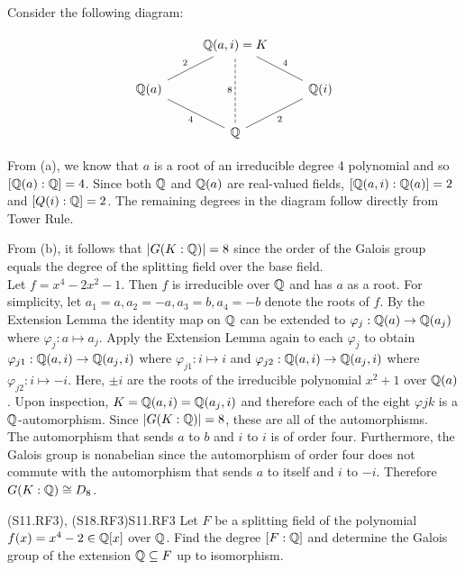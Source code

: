 \documentclass[../AlgebraQualSolutions.tex]{subfiles}
\begin{document}
\begin{solution}
	Consider the following diagram:

	\[
		\begin{tikzcd}
			& \Q(a,i) = K & \\
			\Q(a) \ar[ur,no head, "2"] & & \Q(i) \ar[ul,no head, "4"']\\
			& \Q \ar[ul, no head, "4"] \ar[ur, no head, "2"'] \ar[uu, dashed, no head, "8"] &
		\end{tikzcd}
		\]

	From (a), we know that $a$ is a root of an irreducible degree 4 polynomial and so $[\mathbb{Q}(a): \mathbb{Q}] = 4$. Since both $\mathbb{Q}$ and $\mathbb{Q}(a)$ are real-valued fields, $[\mathbb{Q}(a,i): \mathbb{Q}(a)] = 2$ and $[Q(i): \mathbb{Q}] = 2$. The remaining degrees in the diagram follow directly from Tower Rule. \\
\end{solution}
\begin{solution}
	From (b), it follows that $|G(K:\mathbb{Q})| = 8$ since the order of the Galois group equals the degree of the splitting field over the base field.\\
	
	Let $f = x^4 - 2x^2 - 1$. Then $f$ is irreducible over $\mathbb{Q}$ and has $a$ as a root. For simplicity, let $a_1 = a,a_2 = -a ,a_3 = b,a_4 = -b$ denote the roots of $f$. By the Extension Lemma the identity map on $\mathbb{Q}$ can be extended to $\varphi_j: \mathbb{Q}(a) \to \mathbb{Q}(a_j)$ where $\varphi_j: a \mapsto a_j$. Apply the Extension Lemma again to each $\varphi_j$ to obtain $\varphi_{j1}: \mathbb{Q}(a,i) \to \mathbb{Q}(a_j,i)$ where $\varphi_{j1}: i\mapsto i$ and $\varphi_{j2}: \mathbb{Q}(a,i) \to \mathbb{Q}(a_j,i)$ where $\varphi_{j2}: i \mapsto -i$. Here, $\pm i$ are the roots of the irreducible polynomial $x^2 + 1$ over $\mathbb{Q}(a)$. Upon inspection, $K = \mathbb{Q}(a,i) = \mathbb{Q}(a_j,i)$ and therefore each of the eight $\varphi{jk}$ is a $\mathbb{Q}$-automorphism. Since $|G(K:\mathbb{Q})| = 8$, these are all of the automorphisms.\\

	The automorphism that sends $a$ to $b$ and $i$ to $i$ is of order four. Furthermore, the Galois group is nonabelian since the automorphism of order four does not commute with the automorphism that sends $a$ to itself and $i$ to $-i$. Therefore $G(K:\mathbb{Q}) \cong D_8$.
\end{solution}

\begin{prob}{(S11.RF3), (S18.RF3)}{S11.RF3}
    Let $F$ be a splitting field of the polynomial $f(x) = x^4 - 2 \in \mathbb{Q}[x]$ over $\mathbb{Q}$. Find the degree $[F: \mathbb{Q}]$ and determine the Galois group of the extension $\mathbb{Q} \subseteq F$ up to isomorphism.
\end{prob}
\end{document}
